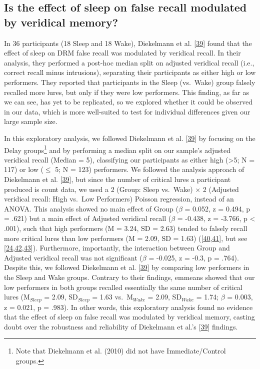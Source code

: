 \documentclass[
]{article}
\begin{document}
\hypertarget{is-the-effect-of-sleep-on-false-recall-modulated-by-veridical-memory}{%
\subsection{Is the effect of sleep on false recall modulated by veridical memory?}\label{is-the-effect-of-sleep-on-false-recall-modulated-by-veridical-memory}}

In 36 participants (18 Sleep and 18 Wake), Diekelmann et al. {[}\protect\hyperlink{ref-diekelmann2010a}{39}{]} found that the effect of sleep on DRM false recall was modulated by veridical recall. In their analysis, they performed a post-hoc median split on adjusted veridical recall (i.e., correct recall minus intrusions), separating their participants as either high or low performers. They reported that participants in the Sleep (vs.~Wake) group falsely recalled more lures, but only if they were low performers. This finding, as far as we can see, has yet to be replicated, so we explored whether it could be observed in our data, which is more well-suited to test for individual differences given our large sample size.

In this exploratory analysis, we followed Diekelmann et al. {[}\protect\hyperlink{ref-diekelmann2010a}{39}{]} by focusing on the Delay groups\footnote{Note that Diekelmann et al. (2010) did not have Immediate/Control groups.} and by performing a median split on our sample's adjusted veridical recall (Median = 5), classifying our participants as either high (\textgreater5; N = 117) or low (\(\leq\) 5; N = 123) performers. We followed the analysis approach of Diekelmann et al. {[}\protect\hyperlink{ref-diekelmann2010a}{39}{]}, but since the number of critical lures a participant produced is count data, we used a 2 (Group: Sleep vs.~Wake) \(\times\) 2 (Adjusted veridical recall: High vs.~Low Performers) Poisson regression, instead of an ANOVA. This analysis showed no main effect of Group (\(\beta\) = 0.052, z = 0.494, p = .621) but a main effect of Adjusted veridical recall (\(\beta\) = -0.438, z = -3.766, p \textless{} .001), such that high performers (M = 3.24, SD = 2.63) tended to falsely recall more critical lures than low performers (M = 2.09, SD = 1.63) ({[}\protect\hyperlink{ref-thapar2001a}{40},\protect\hyperlink{ref-toglia1999a}{41}{]}, but see {[}\protect\hyperlink{ref-roediger2001a}{24},\protect\hyperlink{ref-cann2011a}{42},\protect\hyperlink{ref-stadler1999a}{43}{]}). Furthermore, importantly, the interaction between Group and Adjusted veridical recall was not significant (\(\beta\) = -0.025, z = -0.3, p = .764). Despite this, we followed Diekelmann et al. {[}\protect\hyperlink{ref-diekelmann2010a}{39}{]} by comparing low performers in the Sleep and Wake groups. Contrary to their findings, emmeans showed that our low performers in both groups recalled essentially the same number of critical lures (M\(_{Sleep}\) = 2.09, SD\(_{Sleep}\) = 1.63 vs.~M\(_{Wake}\) = 2.09, SD\(_{Wake}\) = 1.74; \(\beta\) = 0.003, z = 0.021, p = .983). In other words, this exploratory analysis found no evidence that the effect of sleep on false recall was modulated by veridical memory, casting doubt over the robustness and reliability of Diekelmann et al.'s {[}\protect\hyperlink{ref-diekelmann2010a}{39}{]} findings.
\end{document}
